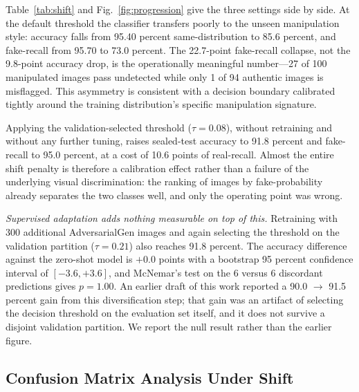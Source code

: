 \documentclass[conference,a4paper]{IEEEtran}
\begin{document}
Table~\ref{tab:shift} and Fig.~\ref{fig:progression} give the three settings
side by side. At the default threshold the classifier transfers poorly to the
unseen manipulation style: accuracy falls from 95.40 percent
same-distribution to 85.6 percent, and fake-recall from 95.70 to
73.0 percent. The 22.7-point
fake-recall collapse, not the 9.8-point accuracy drop, is the operationally
meaningful number---27 of 100 manipulated images pass undetected while only
1 of 94 authentic images is misflagged. This asymmetry is consistent with a
decision boundary calibrated tightly around the training distribution's
specific manipulation signature.

Applying the validation-selected threshold ($\tau = 0.08$), without retraining
and without any further tuning, raises sealed-test accuracy to 91.8 percent
and fake-recall to 95.0 percent, at a cost of 10.6 points of real-recall. Almost
the entire shift penalty is therefore a calibration effect rather than a
failure of the underlying visual discrimination: the ranking of images by
fake-probability already separates the two classes well, and only the operating
point was wrong.

\emph{Supervised adaptation adds nothing measurable on top of this.}
Retraining with 300 additional AdversarialGen images and again selecting the
threshold on the validation partition ($\tau = 0.21$) also reaches
91.8 percent. The accuracy difference against the zero-shot model is $+0.0$
points with a bootstrap 95 percent confidence interval of $[-3.6, +3.6]$, and
McNemar's test on the 6 versus 6 discordant predictions gives $p = 1.00$. An
earlier draft of this work reported a 90.0 $\rightarrow$ 91.5 percent gain
from this diversification step; that gain was an artifact of selecting the
decision threshold on the evaluation set itself, and it does not survive a
disjoint validation partition. We report the null result rather than the
earlier figure.

\subsection{Confusion Matrix Analysis Under Shift}
\end{document}
